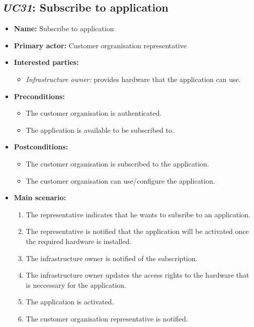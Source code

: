 \subsection{\emph{UC31}: Subscribe to application}
\begin{itemize}
    \item \textbf{Name:} Subscribe to application
    \item \textbf{Primary actor:} Customer orgranisation representative
    \item \textbf{Interested parties:}
        \begin{itemize}
            \item \textit{Infrastructure owner:} provides hardware that the application can use.
        \end{itemize}

    \item \textbf{Preconditions:}
        \begin{itemize}
            \item The customer organisation is authenticated.
            \item The application is available to be subscribed to.
        \end{itemize}

    \item \textbf{Postconditions:}
        \begin{itemize}
            \item The customer organisation is subscribed to the application.
            \item The customer organisation can use/configure the application.
        \end{itemize}

    \item \textbf{Main scenario:}
    \begin{enumerate}
       \item The representative indicates that he wants to subsribe to an
             application.
       \item The representative is notified that the application will be activated
             once the required hardware is installed.
       \item The infrastructure owner is notified of the subscription.
       \item The infrastructure owner updates the access rights to the hardware
             that is neccessary for the application.
       \item The application is activated.
       \item The customer organisation representative is notified.
    \end{enumerate}


\end{itemize}

